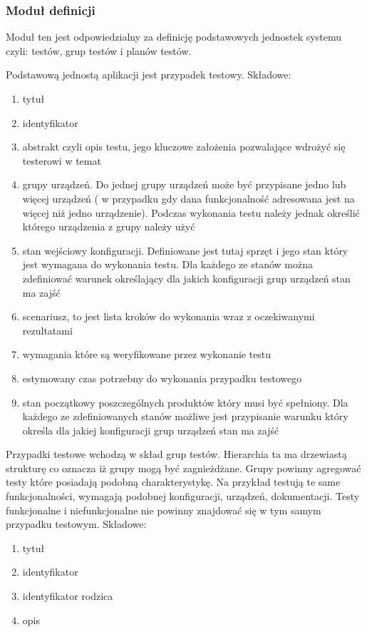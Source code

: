 \subsubsection{Moduł definicji}

Moduł ten jest odpowiedzialny za definicję podstawowych jednostek systemu czyli: testów, grup testów i planów testów. 

Podstawową jednostą aplikacji jest przypadek testowy. Składowe:
\begin{enumerate}
  \item tytuł
  \item identyfikator
  \item abstrakt czyli opis testu, jego kluczowe założenia pozwalające wdrożyć się testerowi w temat
  \item grupy urządzeń. Do jednej grupy urządzeń może być przypisane jedno lub więcej urządzeń ( w przypadku gdy dana funkcjonalność adresowana jest na więcej niż jedno urządzenie). Podczas wykonania testu należy jednak określić którego urządzenia z grupy należy użyć
  \item stan wejściowy konfiguracji. Definiowane jest tutaj sprzęt i jego stan który jest wymagana do wykonania testu. Dla każdego ze stanów można zdefiniować warunek określający dla jakich konfiguracji grup urządzeń stan ma zajść
  \item scenariusz, to jest lista kroków do wykonania wraz z oczekiwanymi rezultatami
  \item wymagania które są weryfikowane przez wykonanie testu
  \item estymowany czas potrzebny do wykonania przypadku testowego
  \item stan początkowy poszczególnych produktów który musi być spełniony. Dla każdego ze zdefiniowanych stanów możliwe jest przypisanie warunku który określa dla jakiej konfiguracji grup urządzeń stan ma zajść
\end{enumerate}

Przypadki testowe wchodzą w skład grup testów. Hierarchia ta ma drzewiastą strukturę co oznacza iż grupy mogą być zagnieżdżane. Grupy powinny agregować testy które posiadają podobną charakterystykę. Na przykład testują te same funkcjonalności, wymagają podobnej konfiguracji, urządzeń, dokumentacji. Testy funkcjonalne i niefunkcjonalne nie powinny znajdować się w tym samym przypadku testowym. Składowe:
\begin{enumerate}
  \item  tytuł
  \item identyfikator
  \item identyfikator rodzica
  \item opis
\end{enumerate}

